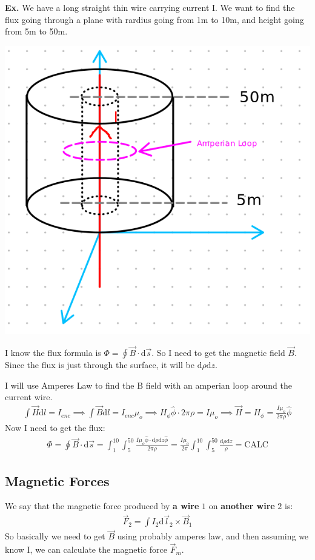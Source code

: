 \documentclass[12pt,letterpaper]{article} \usepackage{amsmath} \usepackage{graphicx} \usepackage[margin=1in]{geometry} \usepackage{longtable}  \usepackage{amssymb}
\begin{document}
	\begin{mdframed}
		\textbf{Ex. } We have a long straight thin wire carrying current I. We want to find the flux going through a plane with rardius going from 1m to 10m, and height going from 5m to 50m. 
		\begin{center}
			\includegraphics[width=0.4\linewidth]{ex3}
		\end{center}
		I know the flux formula is $\Phi = \oint \vec B \cdot \mathrm d \vec s$. So I need to get the magnetic field $\vec B$. Since the flux is just through the surface, it will be $\mathrm d \rho \mathrm d z$.

		I will use Amperes Law to find the B field with an amperian loop around the current wire. 
		\begin{align*}
			\int \vec H \mathrm d l = I_{enc} \implies \int \vec B \mathrm d l = I_{enc} \mu_o \implies H_\phi \hat \phi \cdot 2\pi \rho = I\mu_o \implies \vec H = H_\phi = \frac{I\mu_o}{2\pi \rho} \hat \phi
		\end{align*}
		Now I need to get the flux:
		\begin{align*}
			\Phi = \oint \vec B \cdot \mathrm d \vec s = \int_1^{10}\int_5^{50} \frac{I\mu_o \hat \phi \cdot \mathrm d\rho \mathrm d z \hat\phi}{2\pi\rho} = \frac{I\mu_o}{2\pi}\int_1^{10}\int_5^{50}\frac{\mathrm d \rho \mathrm d z}{\rho} = \text{CALC}
		\end{align*}
		
	\end{mdframed}

	\subsection{Magnetic Forces}
	We say that the magnetic force produced by \textbf{a wire} $1$ on \textbf{another wire} $2$ is: 
	\begin{align*}
		\vec F_2 = \int I_2\mathrm d \vec l_2 \times \vec B_1
	\end{align*}
	So basically we need to get $\vec B$ using probably amperes law, and then assuming we know I, we can calculate the magnetic force $\vec F_m$.
	
\end{document}
